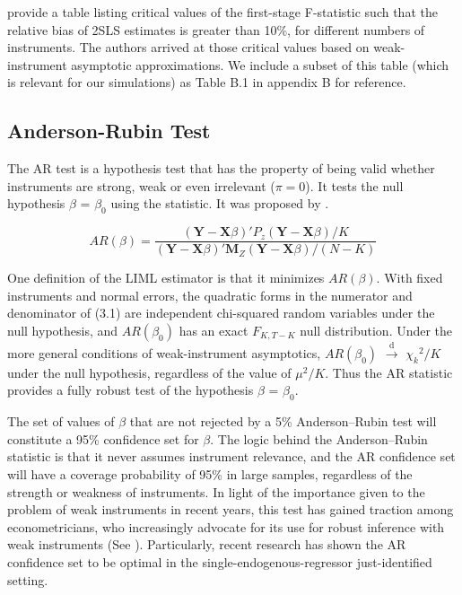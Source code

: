 \cite{stock2002survey} provide a table listing critical values of the first-stage F-statistic such that the relative bias of 2SLS estimates is greater than 10\%, for different numbers of instruments. The authors arrived at those critical values based on weak-instrument asymptotic approximations. We include a subset of this table (which is relevant for our simulations) as Table B.1 in appendix B for reference.


\subsection{Anderson-Rubin Test}


The AR test is a hypothesis test that has the property of being valid whether instruments are strong, weak or even irrelevant ($\pi=0$). It tests the null hypothesis $\beta$ = $\beta_0$ using the statistic. It was proposed by \cite{anderson1949estimation}.

\begin{equation}
  AR(\beta) = \frac{(\mathbf Y- \mathbf X\beta)' P_z (\mathbf Y-\mathbf X\beta)/K}{(\mathbf Y-\mathbf X\beta)' \mathbf M_Z (\mathbf Y-\mathbf X\beta)/(N-K)}
        \end{equation}
        
One definition of the LIML estimator is that it minimizes
$AR(\beta)$.
With fixed instruments and normal errors, the quadratic
forms in the numerator and denominator of (3.1) are independent
chi-squared random variables under the null hypothesis,
and $AR(\beta_0)$ has an exact $F_{K,T - K}$ null distribution. Under the more general conditions of weak-instrument asymptotics, $AR(\beta_0)$ $\xrightarrow{\text{d}}$ ${\chi_k}^2/K$ under the null hypothesis, regardless of the
value of $\mu^2/K$. Thus the AR statistic provides a fully robust
test of the hypothesis $\beta$ = $\beta_0$.
\par The set of
values of $\beta$ that are not rejected by a 5\% Anderson–Rubin test will constitute a 95\% confidence
set for $\beta$. The logic behind the Anderson–Rubin statistic is that it
never assumes instrument relevance, and the AR confidence set will have a
coverage probability of 95\% in large samples, regardless of the strength or weakness of instruments.
In light of the importance given to the problem of weak instruments in recent years, this test has gained traction among econometricians, who increasingly advocate for its use for robust inference with weak instruments (See \cite{staiger1997stock}). Particularly, recent research has shown the AR confidence set to be optimal in the single-endogenous-regressor just-identified setting.